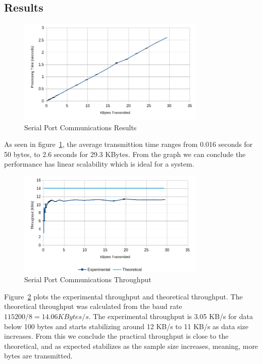 \subsection{Results}\label{chap:evaluation:comms:results}

\begin{figure}[h!]
	\centering
	\includegraphics[width=0.8\textwidth]{./Images/comms-time.png}
	\caption{Serial Port Communications Results}
	\label{fig:performance:comms}
\end{figure}

As seen in figure~\ref{fig:performance:comms}, the average transmittion time ranges from 0.016 seconds for 50 bytes, to 2.6 seconds for 29.3 KBytes.
From the graph we can conclude the performance has linear scalability which is ideal for a system.

\begin{figure}[h!]
	\centering
	\includegraphics[width=0.8\textwidth]{./Images/comms-tput.png}
	\caption{Serial Port Communications Throughput}
	\label{fig:performance:tput}
\end{figure}

Figure~\ref{fig:performance:tput} plots the experimental throughput and theoretical throughput. The theoretical throughput was calculated from the baud rate \(115200/8 = 14.06 KBytes/s\).
The experimental throughput is 3.05 KB/s for data below 100 bytes and starts stabilizing around 12 KB/s to 11 KB/s as data size increases.
From this we conclude the practical throughput is close to the theoretical, and as expected stabilizes as the sample size increases, meaning, more bytes are transmitted.

